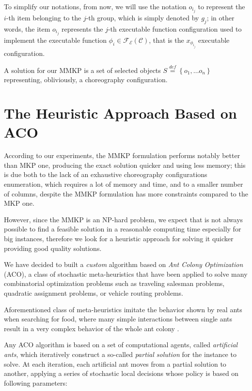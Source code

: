 \documentclass[12pt,a4paper]{report}
\newcommand{\mathDef}{\overset{\textit{def}}{=}}
\begin{document}
To simplify our notations, from now, we will use the notation $o_{i_j}$ to represent the $i$-th item belonging to the $j$-th group, which is simply denoted by $g_j$; in other words, the item $o_{i_j}$ represents the $j$-th executable function configuration used to implement the executable function $\phi_i \in \mathscr{F_E}(\mathcal{C})$, that is the $x_{\phi_{i_j}}$ executable configuration.

A solution for our MMKP is a set of selected objects $S \mathDef \left\{o_{1}, \ldots o_{n} \right\}$ representing, obliviously, a choreography configuration.

\section{The Heuristic Approach Based on ACO}\label{heuristicAlg}

According to our experiments, the MMKP formulation performs notably better than MKP one, producing the exact solution quicker and using less memory; this is due both to the lack of an exhaustive choreography configurations enumeration, which requires a lot of memory and time, and to a smaller number of columns, despite the MMKP formulation has more constraints compared to the MKP one.

However, since the MMKP is an NP-hard problem, we expect that is not always possible to find a feasible solution in a reasonable computing time especially for big instances, therefore we look for a heuristic approach for solving it quicker providing good quality solutions.

We have decided to built a \textit{custom} algorithm based on \textit{Ant Colony Optimization} (ACO), a class of stochastic meta-heuristics that have been applied to solve many combinatorial optimization problems such as traveling salesman problems, quadratic assignment problems, or vehicle routing problems.

Aforementioned class of meta-heuristics imitate the behavior shown by real ants when searching for food, where many simple interactions between single ants result in a very complex behavior of the whole ant colony \citet{acogrosso}\cite{MAXMIN}.

Any ACO algorithm is based on a set of computational agents, called \textit{artificial ants}, which iteratively construct a so-called  \textit{partial solution} for the instance to solve\citet{acogrosso}\cite{MAXMIN}. At each iteration, each artificial ant moves from a partial solution to another, applying a series of stochastic local decisions whose policy is based on following parameters:
\end{document}
